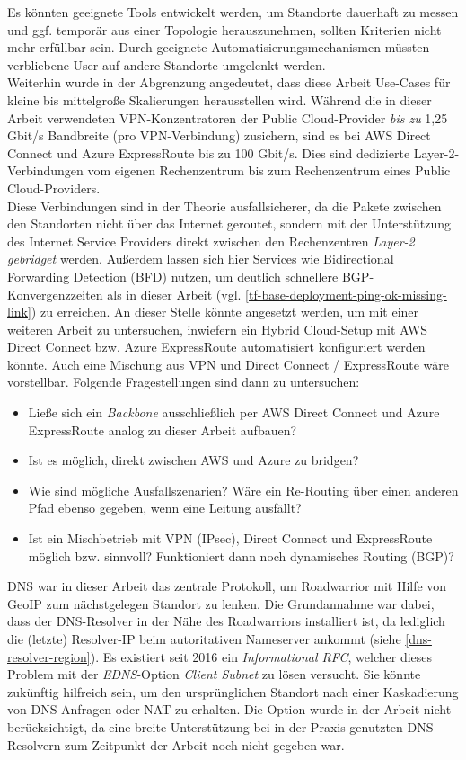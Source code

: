 Es könnten geeignete Tools entwickelt werden, um Standorte dauerhaft zu messen und ggf. temporär aus einer Topologie herauszunehmen, sollten Kriterien nicht mehr erfüllbar sein. Durch geeignete Automatisierungsmechanismen müssten verbliebene User auf andere Standorte \glqq umgelenkt\grqq{} werden.\\
Weiterhin wurde in der Abgrenzung angedeutet, dass diese Arbeit Use-Cases für kleine bis mittelgroße Skalierungen herausstellen wird. Während die in dieser Arbeit verwendeten VPN-Konzentratoren der Public Cloud-Provider \textit{bis zu} 1,25 Gbit/s Bandbreite (pro VPN-Verbindung) zusichern, sind es bei AWS Direct Connect \cite{awsdc2020} und Azure ExpressRoute \cite{Washam2014} bis zu 100 Gbit/s. Dies sind dedizierte Layer-2-Verbindungen vom eigenen Rechenzentrum bis zum Rechenzentrum eines Public Cloud-Providers.\\
Diese Verbindungen sind in der Theorie ausfallsicherer, da die Pakete zwischen den Standorten nicht über das Internet geroutet, sondern mit der Unterstützung des Internet Service Providers direkt zwischen den Rechenzentren \textit{Layer-2 gebridget} werden. Außerdem lassen sich hier Services wie Bidirectional Forwarding Detection (BFD) nutzen, um deutlich schnellere BGP-Konvergenzzeiten als in dieser Arbeit (vgl. \ref{tf-base-deployment-ping-ok-missing-link}) zu erreichen\cite{azurebfd2018}.
An dieser Stelle könnte angesetzt werden, um mit einer weiteren Arbeit zu untersuchen, inwiefern ein Hybrid Cloud-Setup mit AWS Direct Connect bzw. Azure ExpressRoute automatisiert konfiguriert werden könnte. Auch eine Mischung aus VPN und Direct Connect / ExpressRoute wäre vorstellbar. Folgende Fragestellungen sind dann zu untersuchen:
\begin{itemize}
    \item Ließe sich ein \textit{Backbone} ausschließlich per AWS Direct Connect und Azure ExpressRoute analog zu dieser Arbeit aufbauen?
    \item Ist es möglich, direkt zwischen AWS und Azure zu bridgen?
    \item Wie sind mögliche Ausfallszenarien? Wäre ein Re-Routing über einen anderen Pfad ebenso gegeben, wenn eine Leitung ausfällt?
    \item Ist ein Mischbetrieb mit VPN (IPsec), Direct Connect und ExpressRoute möglich bzw. sinnvoll? Funktioniert dann noch dynamisches Routing (BGP)?
\end{itemize}
DNS war in dieser Arbeit das zentrale Protokoll, um Roadwarrior mit Hilfe von GeoIP zum nächstgelegen Standort zu lenken. Die Grundannahme war dabei, dass der DNS-Resolver in der Nähe des Roadwarriors installiert ist, da lediglich die (letzte) Resolver-IP beim autoritativen Nameserver ankommt (siehe \ref{dns-resolver-region}). Es existiert seit 2016 ein \textit{Informational RFC}, welcher dieses Problem mit der \textit{EDNS}-Option \textit{Client Subnet} zu lösen versucht\cite{rfc7871}. Sie könnte zukünftig hilfreich sein, um den ursprünglichen Standort nach einer Kaskadierung von DNS-Anfragen oder NAT zu erhalten. Die Option wurde in der Arbeit nicht berücksichtigt, da eine breite Unterstützung bei in der Praxis genutzten DNS-Resolvern zum Zeitpunkt der Arbeit noch nicht gegeben war.\\ 
